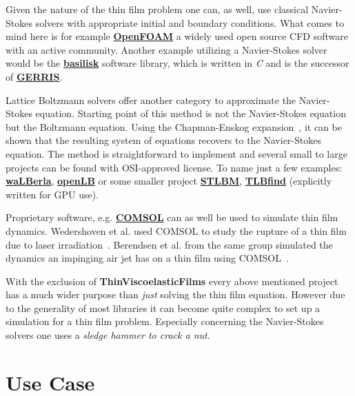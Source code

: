 Given the nature of the thin film problem one can, as well, use classical Navier-Stokes solvers with appropriate initial and boundary conditions.
What comes to mind here is for example \href{https://www.openfoam.com/}{\textbf{OpenFOAM}} a widely used open source CFD software with an active community.
Another example utilizing a Navier-Stokes solver would be the \href{http://basilisk.fr}{\textbf{basilisk}} software library, which is written in \textit{C} and is the successor of \href{http://gfs.sourceforge.net/wiki/index.php/Main_Page}{\textbf{GERRIS}}.

Lattice Boltzmann solvers offer another category to approximate the Navier-Stokes equation.
Starting point of this method is not the Navier-Stokes equation but the Boltzmann equation.
Using the Chapman-Enskog expansion~\cite{chapmanMathematicalTheoryNonuniform1990, enskogKinetischeTheorieVorgange1917}, it can be shown that the resulting system of equations recovers to the Navier-Stokes equation.
The method is straightforward to implement and several small to large projects can be found with OSI-approved license. 
To name just a few examples: \href{https://walberla.net/doxygen/index.html}{\textbf{waLBerla}}, \href{https://www.openlb.net/}{\textbf{openLB}} or some smaller project \href{https://gitlab.com/unigehpfs/stlbm}{\textbf{STLBM}}, \href{https://github.com/FrancescaPelusi/TLBfind}{\textbf{TLBfind}} (explicitly written for GPU use).

Proprietary software, e.g. \href{https://www.comsol.com/}{\textbf{COMSOL}} can as well be used to simulate thin film dynamics.
Wedershoven et al. used COMSOL to study the rupture of a thin film due to laser irradiation~\cite{doi:10.1063/1.4863318}.
Berendsen et al. from the same group simulated the dynamics an impinging air jet has on a thin film using COMSOL~\cite{doi:10.1021/la301353f}.

With the exclusion of \textbf{ThinViscoelasticFilms} every above mentioned project has a much wider purpose than \textit{just} solving the thin film equation.
However due to the generality of most libraries it can become quite complex to set up a simulation for a thin film problem.
Especially concerning the Navier-Stokes solvers one uses a \textit{sledge hammer to crack a nut}.

\section{Use Case}

